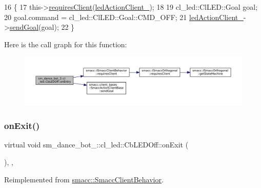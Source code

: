 \begin{DoxyCode}
16   \{
17     this->\hyperlink{classsmacc_1_1ISmaccClientBehavior_a32b16e99e3b4cb289414203dc861a440}{requiresClient}(\hyperlink{classsm__dance__bot__2_1_1cl__led_1_1CbLEDOff_a569146280ebdd71aa5b8f3268eb028bc}{ledActionClient\_});
18 
19     cl\_led::ClLED::Goal goal;
20     goal.command = cl\_led::ClLED::Goal::CMD\_OFF;
21     \hyperlink{classsm__dance__bot__2_1_1cl__led_1_1CbLEDOff_a569146280ebdd71aa5b8f3268eb028bc}{ledActionClient\_}->\hyperlink{classsmacc_1_1client__bases_1_1SmaccActionClientBase_a9c47a5094ac8afb01680307fe5eca922}{sendGoal}(goal);
22   \}
\end{DoxyCode}
Here is the call graph for this function\+:
\nopagebreak
\begin{figure}[H]
\begin{center}
\leavevmode
\includegraphics[width=350pt]{classsm__dance__bot__2_1_1cl__led_1_1CbLEDOff_a101b78da1cfd4dcbec6fc607c956bd14_cgraph}
\end{center}
\end{figure}
\mbox{\label{classsm__dance__bot__2_1_1cl__led_1_1CbLEDOff_a6ca7b3ba30347c4be33d3b4946009325}} 
\subsubsection{\texorpdfstring{on\+Exit()}{onExit()}}
{\footnotesize\ttfamily virtual void sm\+\_\+dance\+\_\+bot\+\_\+::cl\+\_\+led\+::\+Cb\+L\+E\+D\+Off\+::on\+Exit (\begin{DoxyParamCaption}{ }\end{DoxyParamCaption})\hspace{0.3cm}{\ttfamily [inline]}, {\ttfamily [override]}, {\ttfamily [virtual]}}



Reimplemented from \hyperlink{classsmacc_1_1SmaccClientBehavior_a7e4fb6ce81ff96dc172425852d69c0c5}{smacc\+::\+Smacc\+Client\+Behavior}.




